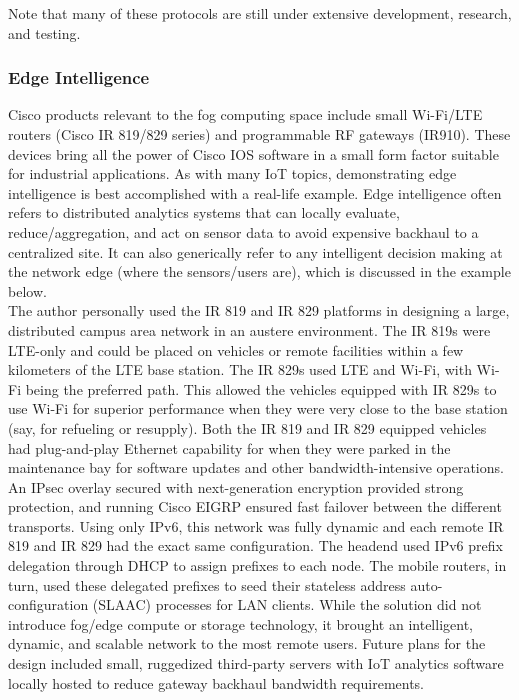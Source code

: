 Note that many of these protocols are still under extensive development,
research, and testing.

\subsubsection{Edge Intelligence}
Cisco products relevant to the fog computing space include small Wi-Fi/LTE
routers (Cisco IR 819/829 series) and programmable RF gateways (IR910). These
devices bring all the power of Cisco IOS software in a small form factor
suitable for industrial applications. As with many IoT topics, demonstrating
edge intelligence is best accomplished with a real-life example. Edge
intelligence often refers to distributed analytics systems that can locally
evaluate, reduce/aggregation, and act on sensor data to avoid expensive
backhaul to a centralized site. It can also generically refer to any
intelligent decision making at the network edge (where the sensors/users are),
which is discussed in the example below. \\

The author personally used the IR 819 and IR 829 platforms in designing a
large, distributed campus area network in an austere environment. The IR 819s
were LTE-only and could be placed on vehicles or remote facilities within a
few kilometers of the LTE base station. The IR 829s used LTE and Wi-Fi, with
Wi-Fi being the preferred path. This allowed the vehicles equipped with IR
829s to use Wi-Fi for superior performance when they were very close to the
base station (say, for refueling or resupply). Both the IR 819 and IR 829
equipped vehicles had plug-and-play Ethernet capability for when they were
parked in the maintenance bay for software updates and other
bandwidth-intensive operations. \\

An IPsec overlay secured with next-generation encryption provided strong
protection, and running Cisco EIGRP ensured fast failover between the
different transports. Using only IPv6, this network was fully dynamic and each
remote IR 819 and IR 829 had the exact same configuration. The headend used
IPv6 prefix delegation through DHCP to assign prefixes to each node. The
mobile routers, in turn, used these delegated prefixes to seed their stateless
address auto-configuration (SLAAC) processes for LAN clients. While the
solution did not introduce fog/edge compute or storage technology, it brought
an intelligent, dynamic, and scalable network to the most remote users. Future
plans for the design included small, ruggedized third-party servers with IoT
analytics software locally hosted to reduce gateway backhaul bandwidth
requirements. \\

